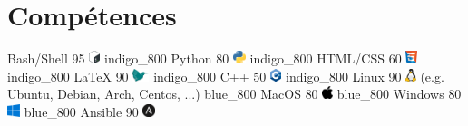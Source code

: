 \documentclass[singlesided,
  paper=a4,
  fontsize=10pt
]{resume}
\begin{document}
{  \section[\nerdfont]{Compétences}
      \skill%
        {Bash/Shell}%
        {95}%
        {\includegraphics[height=1em]{skill/bash.png}}%
        {}%
        {indigo_800}
      \skill%
        {Python}%
        {80}%
        {\includegraphics[height=1em]{skill/python.png}}%
        {}%
        {indigo_800}
      \skill%
        {HTML/CSS}%
        {60}%
        {\includegraphics[height=1em]{skill/html_css.png}}%
        {}%
        {indigo_800}
      \skill%
        {LaTeX}%
        {90}%
        {\includegraphics[height=1em]{skill/latex.png}}%
        {}%
        {indigo_800}
      \skill%
        {C++}%
        {50}%
        {\includegraphics[height=1em]{skill/cpp.png}}%
        {}%
        {indigo_800}
      \skill%
        {Linux}%
        {90}%
        {\includegraphics[height=1em]{skill/linux.png}}%
        {(e.g. Ubuntu, Debian, Arch, Centos, ...)}%
        {blue_800}
      \skill%
        {MacOS}%
        {80}%
        {\includegraphics[height=1em]{skill/apple.png}}%
        {}%
        {blue_800}
      \skill%
        {Windows}%
        {80}%
        {\includegraphics[height=1em]{skill/windows.png}}%
        {}%
        {blue_800}
      \skill%
        {Ansible}%
        {90}%
        {\includegraphics[height=1em]{skill/ansible.png}}%
}
\end{document}
